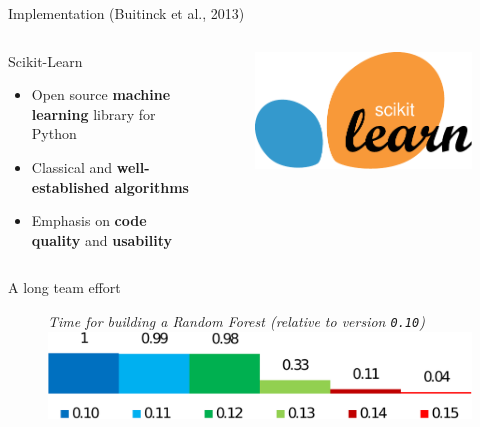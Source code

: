 \documentclass{beamer}
\begin{document}
\begin{frame}{Implementation {\scriptsize (Buitinck et al., 2013)}}

\begin{columns}
\begin{column}[t]{0.7\textwidth}
\begin{block}{Scikit-Learn}
\begin{itemize}
    \item Open source {\bf machine learning} library for Python
    \item Classical and {\bf well-established algorithms}
    \item Emphasis on {\bf code quality} and {\bf usability}
\end{itemize}
\end{block}
\end{column}
\begin{column}[t]{0.20\textwidth}
    \begin{figure}
    \includegraphics[scale=0.35]{./figures/scikit-learn-logo.pdf}
    \end{figure}
\end{column}
\end{columns}

\begin{block}{A long team effort}
\begin{figure}
\vspace{-0.25cm}
{\small \it Time for building a Random Forest (relative to version \texttt{0.10})}\\[1ex]
  \includegraphics[scale=0.5]{./figures/fit-time.pdf}
\end{figure}
\end{block}

\end{frame}
\end{document}
